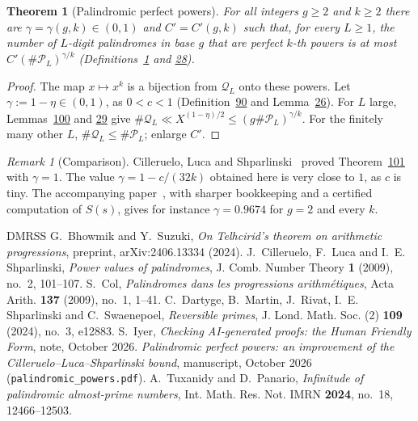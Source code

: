 \documentclass[11pt]{article}
\newcounter{hffc}
\theoremstyle{definition}\newtheorem{hffdef}[hffc]{Definition}
\theoremstyle{plain}\newtheorem{hfflem}[hffc]{Lemma}\newtheorem{hffthm}[hffc]{Theorem}
\theoremstyle{remark}\newtheorem{hffrem}[hffc]{Remark}
\newcommand{\hffcost}{}
\newcommand{\setcost}[1]{\renewcommand{\hffcost}{#1}}
\newcommand{\cP}{\mathcal{P}}\newcommand{\cQ}{\mathcal{Q}}\newcommand{\cB}{\mathcal{B}}\newcommand{\cT}{\mathcal{T}}
\begin{document}
\begin{hffthm}[Palindromic perfect powers]\label{T:main}
For all integers $g\ge2$ and $k\ge2$ there are $\gamma=\gamma(g,k)\in(0,1)$ and $C'=C'(g,k)$ such that, for every $L\ge1$, the number of $L$-digit palindromes in base $g$ that are perfect $k$-th powers is at most $C'(\#\cP_L)^{\gamma/k}$ (Definitions~\hyperref[D:conv]{1} and \hyperref[D:pal]{28}).
\par\nopagebreak{}
\end{hffthm}
\begin{proof}\setcost{length 186/300}The map $x\mapsto x^k$ is a bijection from $\cQ_L$ onto these powers. Let $\gamma:=1-\eta\in(0,1)$, as $0<c<1$ (Definition~\hyperref[D:par]{90} and Lemma~\hyperref[L:saving]{26}). For $L$ large, Lemmas~\hyperref[L:final]{100} and \hyperref[L:npal]{29} give $\#\cQ_L\ll X^{(1-\eta)/2}\le(g\#\cP_L)^{\gamma/k}$. For the finitely many other $L$, $\#\cQ_L\le\#\cP_L$; enlarge $C'$.
\end{proof}

\begin{hffrem}[Comparison]\label{R:compare}
Cilleruelo, Luca and Shparlinski~\cite{CLS} proved Theorem~\hyperref[T:main]{101} with $\gamma=1$. The value $\gamma=1-c/(32k)$ obtained here is very close to $1$, as $c$ is tiny. The accompanying paper~\cite{Pal}, with sharper bookkeeping and a certified computation of $S(s)$, gives for instance $\gamma=0.9674$ for $g=2$ and every $k$.
\end{hffrem}

\begin{thebibliography}{DMRSS}
 G.~Bhowmik and Y.~Suzuki, \emph{On Telhcirid's theorem on arithmetic progressions}, preprint, arXiv:2406.13334 (2024).
 J.~Cilleruelo, F.~Luca and I.~E. Shparlinski, \emph{Power values of palindromes}, J. Comb. Number Theory \textbf{1} (2009), no.~2, 101--107.
 S.~Col, \emph{Palindromes dans les progressions arithm\'etiques}, Acta Arith. \textbf{137} (2009), no.~1, 1--41.
 C.~Dartyge, B.~Martin, J.~Rivat, I.~E. Shparlinski and C.~Swaenepoel, \emph{Reversible primes}, J. Lond. Math. Soc. (2) \textbf{109} (2024), no.~3, e12883.
 S.~Iyer, \emph{Checking AI-generated proofs: the Human Friendly Form}, note, October 2026.
 \emph{Palindromic perfect powers: an improvement of the Cilleruelo--Luca--Shparlinski bound}, manuscript, October 2026 (\texttt{palindromic\_powers.pdf}).
 A.~Tuxanidy and D.~Panario, \emph{Infinitude of palindromic almost-prime numbers}, Int. Math. Res. Not. IMRN \textbf{2024}, no.~18, 12466--12503.
\end{thebibliography}
\end{document}
